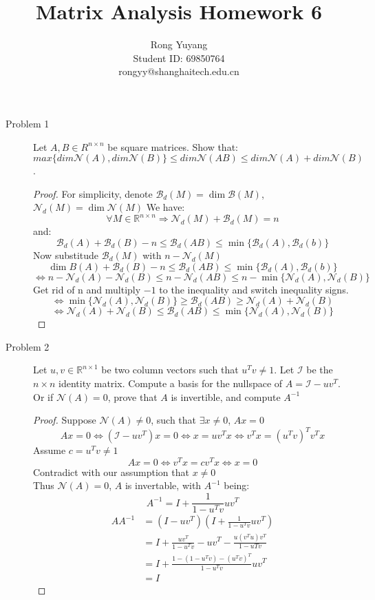 \documentclass{article}
\title{Matrix Analysis Homework 6}
\author{Rong Yuyang \\ Student ID: 69850764 \\ rongyy@shanghaitech.edu.cn}
\begin{document}
\maketitle

\begin{description}

	\item[Problem 1]     Let $A, B \in R^{n \times n}$ be square matrices. Show that: 
	$max \{dim \mathcal{N}(A), dim \mathcal{N}(B)\} \leq dim \mathcal{N}(AB) \leq dim \mathcal{N}(A) + dim \mathcal{N}(B)$. 

	\begin{proof}
	For simplicity, denote $\mathcal{B}_d(M) = \dim \mathcal{B}(M)$, $\mathcal{N}_d(M) = \dim \mathcal{N}(M)$
	We have: 
	$$\forall M \in \mathbb{R}^{n \times n} \Rightarrow \mathcal{N}_d(M) + \mathcal{B}_d(M) = n$$
	and:
	$$\mathcal{B}_d(A) + \mathcal{B}_d(B) - n
	\leq \mathcal{B}_d(AB)
	\leq \min\{\mathcal{B}_d(A), \mathcal{B}_d(b)\}
	$$ 
	Now substitude $\mathcal{B}_d(M)$ with $n - \mathcal{N}_d(M)$
	$$ 	\dim {B}(A) + \mathcal{B}_d(B) - n
		\leq \mathcal{B}_d(AB)
		\leq \min\{\mathcal{B}_d(A), \mathcal{B}_d(b)\}
	$$ $$
	 \Leftrightarrow 
		n - \mathcal{N}_d(A) - \mathcal{N}_d(B)
		\leq n - \mathcal{N}_d(AB)
		\leq n - \min\{\mathcal{N}_d(A), \mathcal{N}_d(B)\}
	$$ 
	Get rid of n and multiply $-1$ to the inequality and switch inequality signs.
	$$
	 \Leftrightarrow 
	 	\min\{\mathcal{N}_d(A), \mathcal{N}_d(B)\}
		\geq \mathcal{B}_d(AB)
		\geq \mathcal{N}_d(A) + \mathcal{N}_d(B)
	$$ $$
	 \Leftrightarrow 
	 	\mathcal{N}_d(A) + \mathcal{N}_d(B)
		\leq \mathcal{B}_d(AB)
		\leq \min\{\mathcal{N}_d(A), \mathcal{N}_d(B)\}
	$$
	\end{proof}

	\item[Problem 2] Let $u,v\in\mathbb{R}^{n\times 1}$ be two column vectors such that $u^Tv\neq 1$. Let $\mathcal{I}$ be the $n\times n$ identity matrix. Compute a basis for the nullspace of $A = \mathcal{I} - uv^T$. Or if $\mathcal{N}(A) = 0$, prove that $A$ is invertible, and compute $A^{-1}$

	\begin{proof}
		Suppose $\mathcal{N}(A) \neq 0$, such that $\exists x \neq 0$, $Ax = 0$ \\
		$$ 				Ax = 0 
		\Leftrightarrow (\mathcal{I}-uv^T)x = 0 
		\Leftrightarrow x = uv^Tx
		\Leftrightarrow v^Tx = (u^Tv)^Tv^Tx$$
		Assume $c = u^Tv \neq 1$
		$$Ax = 0 \Leftrightarrow v^Tx = c v^Tx \Leftrightarrow x = 0$$
		Contradict with our assumption that $x \neq 0$ \\
		Thus $\mathcal{N}(A) = 0$, $A$ is invertable, with $A^{-1}$ being:
		$$A^{-1} = I + \frac{1}{1-u^Tv}uv^T$$
		\begin{equation}\begin{aligned}
			AA^{-1} 
			& = (I-uv^T)(I + \frac{1}{1-u^Tv}uv^T) \\
			& = I + \frac{uv^T}{1-u^Tv} - uv^T - \frac{u(v^Tu)v^T}{1-uTv} \\
			& = I + \frac{1 - (1-u^Tv) - (u^Tv)^T}{1-u^Tv}uv^T \\
			& = I
		\end{aligned}\end{equation}



\end{proof}
\end{description}
\end{document}
